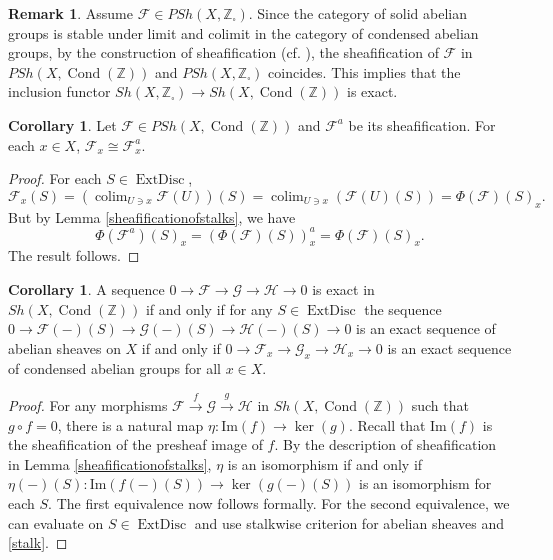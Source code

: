 \documentclass{article}
\theoremstyle{definition}
\newtheorem{corollary}[theorem]{Corollary}
\newtheorem{remark}[theorem]{Remark}
\def\sF{{\mathscr{F}}}
\def\sG{{\mathscr{G}}}
\def\sH{{\mathscr{H}}}
\def\bZ{{\mathbb Z}}
\DeclareMathOperator{\colim}{colim}
\DeclareMathOperator{\cond}{Cond}
\DeclareMathOperator{\ExtDisc}{ExtDisc}
\begin{document}
\begin{remark}\label{remarktosolid}
Assume $\sF\in \mathit{PSh}(X,\bZ_\square)$. Since the category of solid abelian groups is stable under limit and colimit in the category of condensed abelian groups, by the construction of sheafification (cf. \cite[Definition 17.4.5]{kashiwara2006categories}), the sheafification of $\sF$ in $\mathit{PSh}(X,\cond(\bZ))$ and $\mathit{PSh}(X,\bZ_\square)$ coincides. This implies that the inclusion functor $\mathit{Sh}(X,\bZ_\square)\to \mathit{Sh}(X,\cond(\bZ))$ is exact.
\end{remark}
	
	\begin{corollary}\label{corosheafpreservestalk}
		Let $\sF\in \mathit{PSh}(X,\cond(\bZ))$ and $\sF^a$ be its sheafification. For each $x\in X$, $\sF_x\cong \sF_x^a$.
	\end{corollary}
	
	\begin{proof}
		For each $S\in \ExtDisc$, 
		\begin{equation}\label{stalk}
			\sF_x(S)=(\colim_{U\ni x} \sF(U))(S)=\colim_{U\ni x} (\sF(U)(S))=\Phi(\sF)(S)_x.
		\end{equation}
		But by Lemma \ref{sheafificationofstalks}, we have 
		$$\Phi(\sF^a)(S)_x=(\Phi(\sF)(S))^a_x=\Phi(\sF)(S)_x.$$
		The result follows.
	\end{proof}

\begin{corollary}\label{corollaryexact}
	A sequence $0\to \sF\to \sG\to \sH\to 0$ is exact in $\mathit{Sh}(X,\cond(\bZ))$ if and only if for any $S\in \ExtDisc$ the sequence $0\to \sF(-)(S)\to \sG(-)(S)\to \sH(-)(S)\to 0$ is an exact sequence of abelian sheaves on $X$ if and only if $0\to \sF_x\to \sG_x\to \sH_x\to 0$ is an exact sequence of condensed abelian groups for all $x\in X$. 
\end{corollary}

\begin{proof}
For any morphisms $\sF\stackrel{f}\to \sG\stackrel{g}\to \sH$ in $\mathit{Sh}(X,\cond(\bZ))$ such that $g\circ f=0$, there is a natural map $\eta: \mathrm{Im}(f)\to \ker(g)$. Recall that $\mathrm{Im}(f)$ is the sheafification of the presheaf image of $f$. By the description of sheafification in Lemma \ref{sheafificationofstalks},  $\eta$ is an isomorphism if and only if $\eta(-)(S): \mathrm{Im}(f(-)(S))\to \ker(g(-)(S))$ is an isomorphism for each $S$. The first equivalence now follows formally. For the second equivalence, we can evaluate on $S\in \ExtDisc$ and use stalkwise criterion for abelian sheaves and \eqref{stalk}.
\end{proof}
\end{document}
